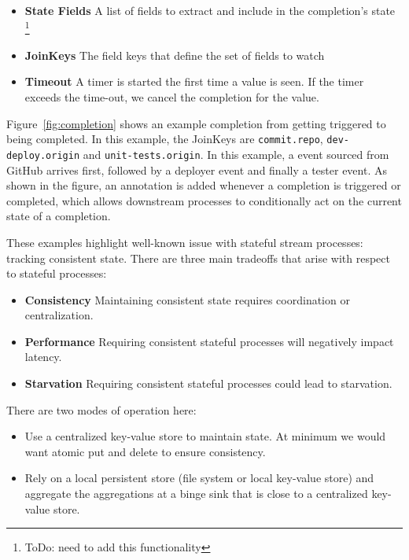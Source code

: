 \documentclass[10pt,twocolumn]{article}
\def\code#1{\texttt{#1}}
\begin{document}
\begin{itemize}
\item[]{\bfseries State Fields} A list of fields to extract and include in the
completion's state \footnote{ToDo: need to add this functionality}
\item[]{{\bfseries JoinKeys}} The field keys that define the set of fields to watch
\item[]{{\bfseries Timeout}} A timer is started the first time a value is seen.
If the timer exceeds the time-out, we cancel the completion for the value.
\end{itemize}

Figure~\ref{fig:completion} shows an example completion from getting triggered
to being completed.  In this example, the JoinKeys are \code{commit.repo},
\code{dev-deploy.origin} and \code{unit-tests.origin}.  In this example, a event sourced
from GitHub arrives first, followed by a deployer event and finally a tester
event.  As shown in the figure, an annotation is added whenever a completion is
triggered or completed, which allows downstream processes to conditionally act
on the current state of a completion.

These examples highlight well-known issue with stateful stream processes:
tracking consistent state.  There are three main tradeoffs that arise with
respect to stateful processes:

\begin{itemize}
\item[]{{\bfseries Consistency}} Maintaining consistent state requires coordination or centralization.
\item[]{{\bfseries Performance}} Requiring consistent stateful processes will negatively impact latency.
\item[]{{\bfseries Starvation}} Requiring consistent stateful processes could lead to starvation.
\end{itemize}

There are two modes of operation here:

\begin{itemize}
\item{Use a centralized key-value store to maintain state.  At minimum we would
want atomic put and delete to ensure consistency.}
\item{Rely on a local persistent store (file system or local key-value store)
and aggregate the aggregations at a binge sink that is close to a centralized
key-value store.}
\end{itemize}
\end{document}
